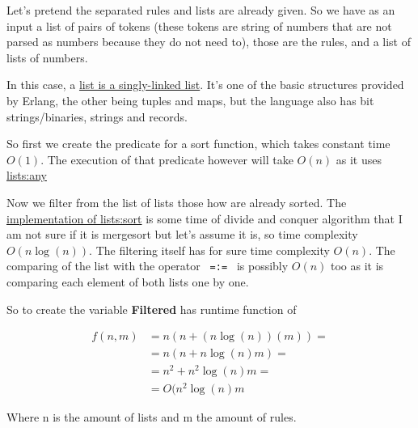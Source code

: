 \documentclass[a4paper,12pt]{article}
\theoremstyle{mytheoremstyle}
\theoremstyle{mytheoremstyle}
\theoremstyle{myproblemstyle}
\begin{document}
    Let's pretend the separated rules and lists are already given. So we have
    as an input a list of pairs of tokens (these tokens are string of numbers
    that are not parsed as numbers because they do not need to), those are the
    rules, and a list of lists of numbers.

    In this case, a
    \href{https://www.erlang.org/docs/23/reference_manual/data_types#list}{list
    is a singly-linked list}. It's one of the basic structures provided by
    Erlang, the other being tuples and maps, but the language also has bit
    strings/binaries, strings and records.

    So first we create the predicate for a sort function, which takes constant
    time $ O \left( 1 \right) $. The execution of that predicate however will
    take $ O \left( n \right) $ as it uses
    \href{https://github.com/erlang/otp/blob/master/lib/stdlib/src/lists.erl#L2039}{lists:any}

    Now we filter from the list of lists those how are already sorted. The
    \href{https://github.com/erlang/otp/blob/master/lib/stdlib/src/lists.erl#L1652}{implementation
    of lists:sort} is some time of divide and conquer algorithm that I am not
    sure if it is mergesort but let's assume it is, so time complexity $ O
    \left( n \log \left( n \right) \right) $. The filtering itself has for sure
    time complexity $ O \left( n \right) $. The comparing of the list with the
    operator \texttt{ =:= } is possibly $ O \left( n \right) $ too as it is
    comparing each element of both lists one by one.

    So to create the variable \textbf{Filtered} has runtime function of

    \begin{equation}
        \begin{split}
            f(n, m) & = n ( n + ( n \log ( n ) ) ( m ) ) = \\
            & = n ( n + n \log ( n ) m ) = \\
            & = n^{2} + n^{2} \log ( n ) m = \\
            & = O ( n^{2} \log ( n ) m
        \end{split}
    \end{equation}

    Where n is the amount of lists and m the amount of rules.

    \clearpage

    \printbibliography[
    heading=bibintoc,
    category=cited
    ]

    \printbibliography[
    heading=bibintoc,
    notcategory=cited,
    title={Other Resources}
    ]
\end{document}

